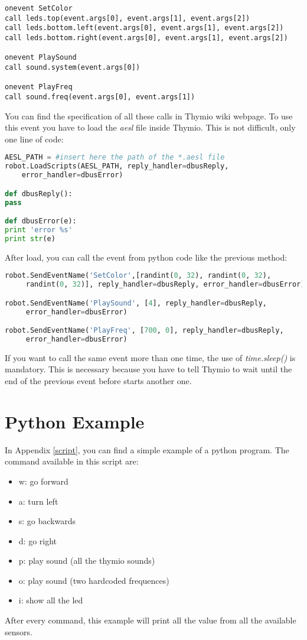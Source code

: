 \documentclass[12pt]{article}%
\begin{document}
		\begin{lstlisting}
onevent SetColor
call leds.top(event.args[0], event.args[1], event.args[2])
call leds.bottom.left(event.args[0], event.args[1], event.args[2])
call leds.bottom.right(event.args[0], event.args[1], event.args[2])

onevent PlaySound
call sound.system(event.args[0])

onevent PlayFreq
call sound.freq(event.args[0], event.args[1])
		\end{lstlisting}

		You can find the specification of all these calls in Thymio wiki webpage.
		To use this event you have to load the \textit{aesl} file inside Thymio. 
		This is not difficult, only one line of code:
		
		\begin{lstlisting}[language=Python]
AESL_PATH = #insert here the path of the *.aesl file
robot.LoadScripts(AESL_PATH, reply_handler=dbusReply,
    error_handler=dbusError)

def dbusReply():
pass

def dbusError(e):
print 'error %s'
print str(e)
		\end{lstlisting}
		
		After load, you can call the event from python code like the previous method:
		
		\begin{lstlisting}[language=Python]
robot.SendEventName('SetColor',[randint(0, 32), randint(0, 32),
     randint(0, 32)], reply_handler=dbusReply, error_handler=dbusError)

robot.SendEventName('PlaySound', [4], reply_handler=dbusReply, 
     error_handler=dbusError)

robot.SendEventName('PlayFreq', [700, 0], reply_handler=dbusReply, 
     error_handler=dbusError)
		\end{lstlisting}
		
		If you want to call the same event more than one time, the use of \textit{time.sleep()} is mandatory. 
		This is necessary because you have to tell Thymio to wait until the end of the previous event before starts another one.


\section{Python Example}

	In Appendix \ref{script}, you can find a simple example of a python program. The command available in this script are:
	\begin{itemize}
		\item w: go forward
		\item a: turn left
		\item s: go backwards
		\item d: go right
		\item p: play sound (all the thymio sounds)
		\item o: play sound (two hardcoded frequences)
		\item i: show all the led
	\end{itemize}
	After every command, this example will print all the value from all the available sensors.
	
\end{document}
